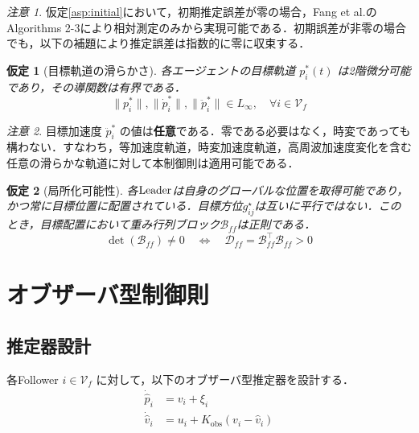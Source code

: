 \documentclass[a4paper]{jarticle}
\newtheorem{assumption}{仮定}[section]
\theoremstyle{definition}
\theoremstyle{remark}
\newtheorem{remark}{注意}[section]
\numberwithin{equation}{section}
\begin{document}
	\begin{remark}
		仮定\ref{asp:initial}において，初期推定誤差が零の場合，Fang et al.\cite{SD}のAlgorithms 2-3により相対測定のみから実現可能である．初期誤差が非零の場合でも，以下の補題により推定誤差は指数的に零に収束する．
	\end{remark}
	
	\begin{screen}
		\begin{assumption}[目標軌道の滑らかさ]
			各エージェントの目標軌道 $p_i^*(t)$ は2階微分可能であり，その導関数は有界である．
			\begin{equation}
				\|p_i^*\|, \|\dot{p}_i^*\|, \|\ddot{p}_i^*\| \in L_\infty, \quad \forall i \in \mathcal{V}_f
				\label{eq:trajectory_smoothness}
			\end{equation}
			\label{asp:trajectory}
		\end{assumption}
	\end{screen}
	
	\begin{remark}
		目標加速度 $\ddot{p}_i^*$ の値は\textbf{任意}である．零である必要はなく，時変であっても構わない．すなわち，等加速度軌道，時変加速度軌道，高周波加速度変化を含む任意の滑らかな軌道に対して本制御則は適用可能である．
	\end{remark}
	
	\begin{screen}
		\begin{assumption}[局所化可能性]
			各$\rm{Leader}$は自身のグローバルな位置を取得可能であり，かつ常に目標位置に配置されている．目標方位${g}^\star_{ij}$は互いに平行ではない．このとき，目標配置において重み行列ブロック$\mathcal{B}_{ff}$は正則である．
			\begin{equation}
				\det(\mathcal{B}_{ff}) \neq 0 \quad \Leftrightarrow \quad \mathcal{D}_{ff} = \mathcal{B}_{ff}^\top \mathcal{B}_{ff} > 0
				\label{eq:localizability}
			\end{equation}
			\label{asp:localizability}
		\end{assumption}
	\end{screen}
	
	\section{オブザーバ型制御則}
	\subsection{推定器設計}
	
	各Follower $i \in \mathcal{V}_f$ に対して，以下のオブザーバ型推定器を設計する．
	\begin{align}
		\dot{\hat{p}}_i &= v_i + \xi_i \label{eq:est_p}\\
		\dot{\hat{v}}_i &= u_i + K_{\mathrm{obs}}(v_i - \hat{v}_i) \label{eq:est_v}
	\end{align}
	
\end{document}
